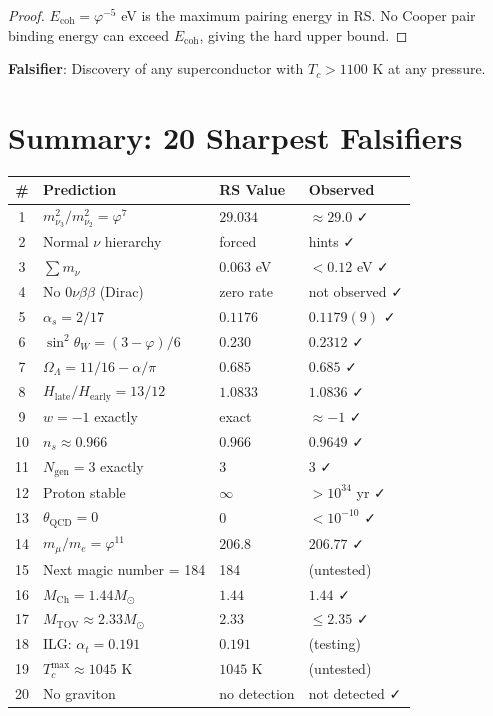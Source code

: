 \documentclass[12pt,a4paper]{article}
\theoremstyle{definition}
\theoremstyle{remark}
\begin{document}
\begin{proof}
$E_\mathrm{coh} = \varphi^{-5}$ eV is the maximum pairing energy in RS. No Cooper pair 
binding energy can exceed $E_\mathrm{coh}$, giving the hard upper bound.
\end{proof}

\textbf{Falsifier}: Discovery of any superconductor with $T_c > 1100$ K at any pressure.

\section{Summary: 20 Sharpest Falsifiers}

\begin{center}
\begin{tabular}{clll}
\toprule
\# & \textbf{Prediction} & \textbf{RS Value} & \textbf{Observed} \\
\midrule
1 & $m_{\nu_3}^2/m_{\nu_2}^2 = \varphi^7$ & $29.034$ & $\approx 29.0$ ✓ \\
2 & Normal $\nu$ hierarchy & forced & hints ✓ \\
3 & $\sum m_\nu$ & $0.063$ eV & $< 0.12$ eV ✓ \\
4 & No $0\nu\beta\beta$ (Dirac) & zero rate & not observed ✓ \\
5 & $\alpha_s = 2/17$ & $0.1176$ & $0.1179(9)$ ✓ \\
6 & $\sin^2\theta_W = (3-\varphi)/6$ & $0.230$ & $0.2312$ ✓ \\
7 & $\Omega_\Lambda = 11/16 - \alpha/\pi$ & $0.685$ & $0.685$ ✓ \\
8 & $H_\mathrm{late}/H_\mathrm{early} = 13/12$ & $1.0833$ & $1.0836$ ✓ \\
9 & $w = -1$ exactly & exact & $\approx -1$ ✓ \\
10 & $n_s \approx 0.966$ & $0.966$ & $0.9649$ ✓ \\
11 & $N_\mathrm{gen} = 3$ exactly & 3 & 3 ✓ \\
12 & Proton stable & $\infty$ & $> 10^{34}$ yr ✓ \\
13 & $\theta_\mathrm{QCD} = 0$ & $0$ & $< 10^{-10}$ ✓ \\
14 & $m_\mu/m_e = \varphi^{11}$ & $206.8$ & $206.77$ ✓ \\
15 & Next magic number = 184 & 184 & (untested) \\
16 & $M_\mathrm{Ch} = 1.44 M_\odot$ & $1.44$ & $1.44$ ✓ \\
17 & $M_\mathrm{TOV} \approx 2.33 M_\odot$ & $2.33$ & $\leq 2.35$ ✓ \\
18 & ILG: $\alpha_t = 0.191$ & $0.191$ & (testing) \\
19 & $T_c^\mathrm{max} \approx 1045$ K & $1045$ K & (untested) \\
20 & No graviton & no detection & not detected ✓ \\
\bottomrule
\end{tabular}
\end{center}
\end{document}
